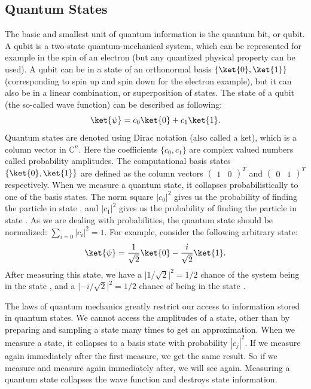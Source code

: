 \documentclass[a4paper,10pt]{article}
\begin{document}
\subsection{Quantum States}
The basic and smallest unit of quantum information is the quantum bit, or qubit.
A qubit is a two-state quantum-mechanical system, which can be represented for example in the spin of an electron (but any quantized physical property can be used).
A qubit can be in a state of an orthonormal basis $\{\ket{0}, \ket{1}\}$ (corresponding to spin up and spin down for the electron example), but it can also be in a linear combination, or superposition of states.
The state of a qubit (the so-called wave function) can be described as following:
\begin{equation}
\ket{\psi} = c_0\ket{0} + c_1\ket{1}.
\end{equation}
Quantum states are denoted using Dirac notation \ket{\,\cdotp\,} (also called a ket), which is a column vector in $\mathbb{C}^n$.
Here the coefficients $\{c_0, c_1\}$ are complex valued numbers called probability amplitudes.
The computational basis states $\{\ket{0}, \ket{1}\}$ are defined as the column vectors $(\begin{matrix}1 & 0\end{matrix})^T$ and $(\begin{matrix}0 & 1\end{matrix})^T$ respectively.
When we measure a quantum state, it collapses probabilistically to one of the basis states.
The norm square $|c_0|^2$ gives us the probability of finding the particle in state , and $|c_1|^2$ gives us the probability of finding the particle in state .
As we are dealing with probabilities, the quantum state should be normalized: $\sum_{i=0}|c_i|^2 = 1$.
For example, consider the following arbitrary state:
\begin{equation} \label{eq:arbitary_state_example}
\ket{\psi} = \dfrac{1}{\sqrt2}\ket{0} - \dfrac{i}{\sqrt2}\ket{1}.
\end{equation}
After measuring this state, we have a $\lvert1/\sqrt2\rvert^2 = 1/2$ chance of the system being in the state , and a $\lvert{-}i/\sqrt2\rvert^2 = 1/2$ chance of being in the state .

The laws of quantum mechanics greatly restrict our access to information stored in quantum states.
We cannot access the amplitudes of a state, other than by preparing and sampling a state many times to get an approximation. 
When we measure a state, it collapses to a basis state  with probability $|c_j|^2$.
If we measure again immediately after the first measure, we get the same result.
So if we measure  and measure again immediately after, we will see  again.
Measuring a quantum state collapses the wave function and destroys state information.
\end{document}
